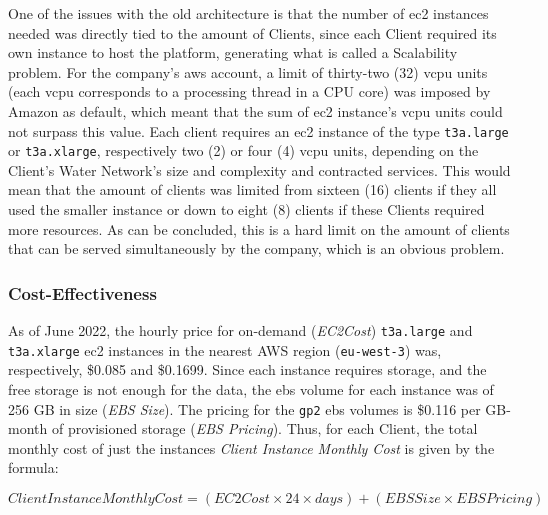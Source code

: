 
One of the issues with the old architecture is that the number of \gls{ec2} instances needed was directly tied to the amount of Clients, since each Client required its own instance to host the platform, generating what is called a Scalability problem. For the company's \gls{aws} account, a limit of thirty-two (32) \gls{vcpu} units (each \gls{vcpu} corresponds to a processing thread in a CPU core) was imposed by Amazon as default, which meant that the sum of \gls{ec2} instance's \gls{vcpu} units could not surpass this value. Each client requires an \gls{ec2} instance of the type \texttt{t3a.large} or \texttt{t3a.xlarge}, respectively two (2) or four (4) \gls{vcpu} units, depending on the Client's Water Network's size and complexity and contracted services. This would mean that the amount of clients was limited from sixteen (16) clients if they all used the smaller instance or down to eight (8) clients if these Clients required more resources. As can be concluded, this is a hard limit on the amount of clients that can be served simultaneously by the company, which is an obvious problem.


\subsubsection{Cost-Effectiveness}\label{methodology:sss:cost-effectiveness}

As of June 2022, the hourly price for on-demand (\textit{EC2Cost}) \texttt{t3a.large} and \texttt{t3a.xlarge} \gls{ec2} instances in the nearest AWS region (\texttt{eu-west-3}) was, respectively, \$0.085 and \$0.1699. Since each instance requires storage, and the free storage is not enough for the data, the \gls{ebs} volume for each instance was of 256 GB in size (\textit{EBS Size}). The pricing for the \texttt{gp2} \gls{ebs} volumes is \$0.116 per GB-month of provisioned storage (\textit{EBS Pricing}). 
Thus, for each Client, the total monthly cost of just the instances \textit{Client Instance Monthly Cost} is given by the formula:

\begin{equation}
    \label{eq:ec2-instance-cost}
    Client Instance Monthly Cost = ( EC2 Cost \times 24 \times  days) + (EBS Size \times  EBS Pricing )
    \end{equation}

